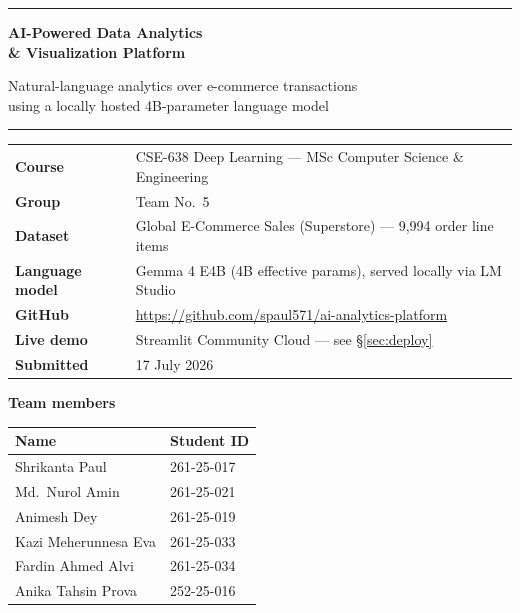 \documentclass[11pt,a4paper]{article}
\begin{document}
\begin{titlepage}
\centering
\vspace*{2.2cm}

{\color{brand}\rule{\textwidth}{2pt}}
\vspace{0.8cm}

{\Huge\bfseries AI-Powered Data Analytics\\[0.25cm] \& Visualization Platform\par}
\vspace{0.7cm}

{\large Natural-language analytics over e-commerce transactions\\ using a locally hosted 4B-parameter language model\par}
\vspace{0.4cm}

{\color{brand}\rule{\textwidth}{2pt}}
\vspace{1.4cm}

\begin{tabular}{@{}ll@{}}
\textbf{Course}         & CSE-638 Deep Learning --- MSc Computer Science \& Engineering \\[2pt]
\textbf{Group}          & Team No.\ 5 \\[2pt]
\textbf{Dataset}        & Global E-Commerce Sales (Superstore) --- 9,994 order line items \\[2pt]
\textbf{Language model} & Gemma 4 E4B (4B effective params), served locally via LM Studio \\[2pt]
\textbf{GitHub}         & \url{https://github.com/spaul571/ai-analytics-platform} \\[2pt]
\textbf{Live demo}      & Streamlit Community Cloud --- see \S\ref{sec:deploy} \\[2pt]
\textbf{Submitted}      & 17 July 2026 \\
\end{tabular}

\vspace{1.2cm}
{\large\bfseries Team members\par}
\vspace{0.35cm}

\begin{tabular}{@{}ll@{}}
\toprule
\textbf{Name} & \textbf{Student ID} \\
\midrule
Shrikanta Paul        & 261-25-017 \\
Md.\ Nurol Amin       & 261-25-021 \\
Animesh Dey           & 261-25-019 \\
Kazi Meherunnesa Eva  & 261-25-033 \\
Fardin Ahmed Alvi     & 261-25-034 \\
Anika Tahsin Prova    & 252-25-016 \\
\bottomrule
\end{tabular}


\end{titlepage}
\end{document}
